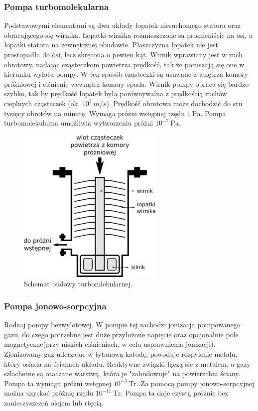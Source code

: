 \documentclass[paper=a4, fontsize=12pt]{scrartcl}
\begin{document}
\subsubsection{Pompa turbomolekularna}
Podstawowymi elementami są dwa układy łopatek nieruchomego statora oraz obracającego się wirnika. Łopatki wirnika rozmieszczone są promieniście na osi, a łopatki statora na zewnętrznej obudowie. Płaszczyzna łopatek nie jest prostopadła do osi, lecz skręcona o pewien kąt. 
Wirnik wprawiany jest w ruch obrotowy, nadając cząsteczkom powietrza prędkość, tak że poruszają się one w kierunku wylotu pompy. W ten sposób cząsteczki są usuwane z wnętrza komory próżniowej i ciśnienie wewnątrz komory spada. Wirnik pompy obraca się bardzo szybko, tak by prędkość łopatek była porównywalna z prędkością ruchów cieplnych cząsteczek (ok. $ 10^3\ m/s$). Prędkość obrotowa może dochodzić do stu tysięcy obrotów na minutę. Wymaga próżni wstępnej rzędu $1\:\mathrm{Pa}$. Pompa turbomolekularna umożliwia wytworzeniu próżni $10^{-7}\:\mathrm{Pa}$.
\begin{figure}[h!]
\centering
\includegraphics[width=0.5\linewidth]{turbo2}
\caption{Schemat budowy turbomlekularnej.}
\label{fig:turbo2}
\end{figure}

\subsubsection{Pompa jonowo-sorpcyjna}
Rodzaj pompy bezwylotowej. W pompie tej zachodzi jonizacja pompowanego gazu, do czego potrzebne jest duże przyłożone napięcie oraz opcjonalnie pole magnetyczne(przy niskich ciśnieniach, w celu usprawnienia jonizacji). Zjonizowany gaz uderzając w tytanową katodę, powoduje rozpylenie metalu, który osiada na ścianach układu. Reaktywne związki łączą sie z metalem, a gazy szlachetne są otaczane warstwą, która je "zabudowuje" na powierzchni ściany. Pompa ta wymaga próżni wstępnej $10^{-3}\:\mathrm{Tr}$. Za pomocą pompy jonowo-sorpcyjnej można uzyskać próżnię rzędu $10^{-11}\:\mathrm{Tr}$. Pompa ta daje czystą próżnię bez zanieczyszczeń olejem lub rtęcią.
\end{document}
